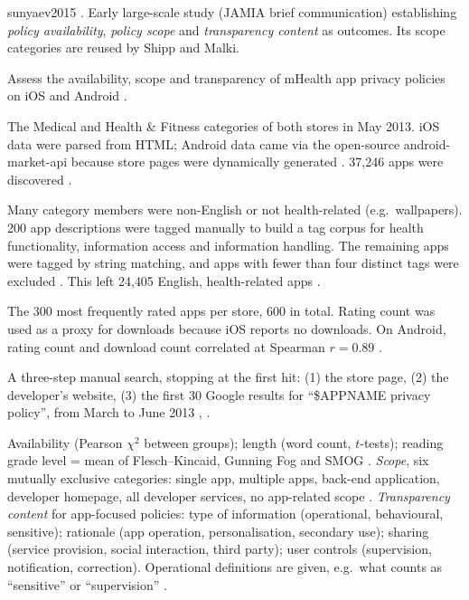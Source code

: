 \begin{papercard}{sunyaev2015}
   . Early large-scale study (JAMIA brief communication) establishing \emph{policy availability}, \emph{policy scope} and \emph{transparency content} as outcomes. Its scope categories are reused by Shipp and Malki.

 Assess the availability, scope and transparency of mHealth app privacy policies on iOS and Android .

 The Medical and Health \& Fitness categories of both stores in May 2013. iOS data were parsed from HTML; Android data came via the open-source android-market-api because store pages were dynamically generated . 37{,}246 apps were discovered .

 Many category members were non-English or not health-related (e.g.\ wallpapers). 200 app descriptions were tagged manually to build a tag corpus for health functionality, information access and information handling. The remaining apps were tagged by string matching, and apps with fewer than four distinct tags were excluded . This left 24{,}405 English, health-related apps .

 The 300 most frequently rated apps per store, 600 in total. Rating count was used as a proxy for downloads because iOS reports no downloads. On Android, rating count and download count correlated at Spearman $r=0.89$ .

 A three-step manual search, stopping at the first hit: (1) the store page, (2) the developer's website, (3) the first 30 Google results for ``\$APPNAME privacy policy'', from March to June 2013 , .

 Availability (Pearson $\chi^2$ between groups); length (word count, $t$-tests); reading grade level = mean of Flesch--Kincaid, Gunning Fog and SMOG . \emph{Scope}, six mutually exclusive categories: single app, multiple apps, back-end application, developer homepage, all developer services, no app-related scope . \emph{Transparency content} for app-focused policies: type of information (operational, behavioural, sensitive); rationale (app operation, personalisation, secondary use); sharing (service provision, social interaction, third party); user controls (supervision, notification, correction). Operational definitions are given, e.g.\ what counts as ``sensitive'' or ``supervision'' .


\end{papercard}
